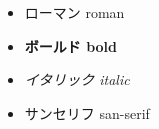 \documentclass[a4j]{ltjsarticle}
\begin{document}
\begin{itemize}
	\item \textrm{ローマン roman}
	\item \textbf{ボールド bold}
	\item \textit{イタリック italic}
	\item \textsf{サンセリフ san-serif}
\end{itemize}
\end{document}
